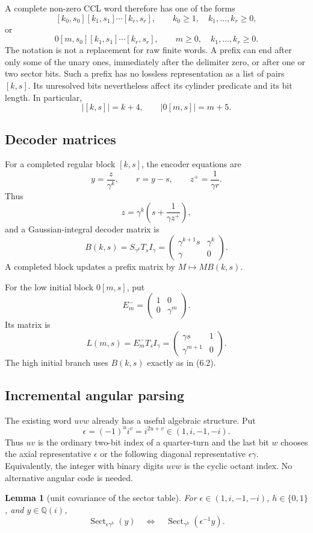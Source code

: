 \documentclass[10pt]{article}
\newtheorem{lemma}[theorem]{Lemma}
\theoremstyle{definition}
\theoremstyle{remark}
\newcommand{\Qi}{\mathbb{Q}(i)}
\newcommand{\bits}{\{0,1\}}
\newcommand{\mat}[4]{\begin{pmatrix}#1&#2\\#3&#4\end{pmatrix}}
\begin{document}
A complete non-zero CCL word therefore has one of the forms
\[
 [k_0,s_0][k_1,s_1]\cdots[k_r,s_r],\qquad k_0\ge1,\quad k_1,\ldots,k_r\ge0,
\]
or
\[
 0[m,s_0][k_1,s_1]\cdots[k_r,s_r],\qquad m\ge0,\quad k_1,\ldots,k_r\ge0.
\]
The notation is not a replacement for raw finite words.  A prefix can end after only some of the unary ones, immediately after the delimiter zero, or after one or two sector bits.  Such a prefix has no lossless representation as a list of pairs $[k,s]$.  Its unresolved bits nevertheless affect its cylinder predicate and its bit length.  In particular,
\[
 |[k,s]|=k+4,\qquad |0[m,s]|=m+5.
\]

\subsection{Decoder matrices}

For a completed regular block $[k,s]$, the encoder equations are
\[
 y=\frac z{\gamma^k},\qquad
 r=y-s,
 \qquad
 z^+=\frac1{\gamma r}.
\]
Thus
\[
 z=\gamma^k\left(s+\frac1{\gamma z^+}\right),
\]
and a Gaussian-integral decoder matrix is
\[
 B(k,s)=S_{\gamma^k}T_sI_\gamma
 =\mat{\gamma^{k+1}s}{\gamma^k}{\gamma}{0}.
\tag{6.2}
\]
A completed block updates a prefix matrix by $M\mapsto MB(k,s)$.

For the low initial block $0[m,s]$, put
\[
 E^-_m=\mat{1}{0}{0}{\gamma^m}.
\]
Its matrix is
\[
 L(m,s)=E^-_mT_sI_\gamma
 =\mat{\gamma s}{1}{\gamma^{m+1}}{0}.
\tag{6.3}
\]
The high initial branch uses $B(k,s)$ exactly as in (6.2).

\subsection{Incremental angular parsing}\label{subsec:angular-folding}

The existing word $uvw$ already has a useful algebraic structure.  Put
\[
 \epsilon=(-1)^u i^v=i^{2u+v}\in(1,i,-1,-i).
\]
Thus $uv$ is the ordinary two-bit index of a quarter-turn and the last bit $w$ chooses the axial representative $\epsilon$ or the following diagonal representative $\epsilon\gamma$.  Equivalently, the integer with binary digits $uvw$ is the cyclic octant index.  No alternative angular code is needed.

\begin{lemma}[unit covariance of the sector table]\label{lem:sector-unit-covariance}
For $\epsilon\in(1,i,-1,-i)$, $h\in\bits$, and $y\in\Qi$,
\[
 \operatorname{Sect}_{\epsilon\gamma^h}(y)
 \quad\Longleftrightarrow\quad
 \operatorname{Sect}_{\gamma^h}(\epsilon^{-1}y).
\tag{6.4}
\]
\end{lemma}
\end{document}
